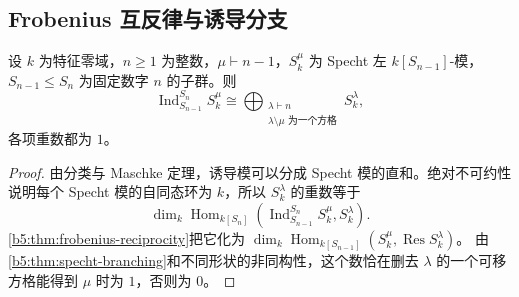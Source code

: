 \subsection{Frobenius 互反律与诱导分支}
\label{b5:subsec:0605:04}

\begin{corollary}[诱导分支]\label{b5:cor:specht-induction-branching}
	设 \(k\) 为特征零域，\(n\ge1\) 为整数，\(\mu\vdash n-1\)，\(S_k^\mu\) 为 Specht 左 \(k[S_{n-1}]\)-模，\(S_{n-1}\le S_n\) 为固定数字 \(n\) 的子群。则
	\[
		\operatorname{Ind}_{S_{n-1}}^{S_n}S_k^\mu \cong\bigoplus_{\substack{\lambda\vdash n\\
				\lambda\setminus\mu\text{ 为一个方格}}}S_k^\lambda,
	\]
	各项重数都为 \(1\)。
\end{corollary}
\begin{proof}
	由分类与 Maschke 定理，诱导模可以分成 Specht 模的直和。绝对不可约性说明每个 Specht 模的自同态环为 \(k\)，所以 \(S_k^\lambda\) 的重数等于
	\[
		\dim_k\operatorname{Hom}_{k[S_n]} \left(\operatorname{Ind}_{S_{n-1}}^{S_n}S_k^\mu,S_k^\lambda\right).
	\]
	\cref{b5:thm:frobenius-reciprocity}把它化为 \(\dim_k\operatorname{Hom}_{k[S_{n-1}]} (S_k^\mu,\operatorname{Res}S_k^\lambda)\)。 由\cref{b5:thm:specht-branching}和不同形状的非同构性，这个数恰在删去 \(\lambda\) 的一个可移方格能得到 \(\mu\) 时为 \(1\)，否则为 \(0\)。
\end{proof}
